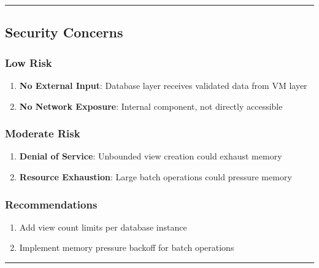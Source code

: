 \documentclass[
]{article}
\providecommand{\tightlist}{%
  \setlength{\itemsep}{0pt}\setlength{\parskip}{0pt}}
\begin{document}
\begin{center}\rule{0.5\linewidth}{0.5pt}\end{center}

\subsection{Security Concerns}\label{security-concerns}

\subsubsection{Low Risk}\label{low-risk}

\begin{enumerate}
\def\labelenumi{\arabic{enumi}.}
\tightlist
\item
  \textbf{No External Input}: Database layer receives validated data
  from VM layer
\item
  \textbf{No Network Exposure}: Internal component, not directly
  accessible
\end{enumerate}

\subsubsection{Moderate Risk}\label{moderate-risk}

\begin{enumerate}
\def\labelenumi{\arabic{enumi}.}
\tightlist
\item
  \textbf{Denial of Service}: Unbounded view creation could exhaust
  memory
\item
  \textbf{Resource Exhaustion}: Large batch operations could pressure
  memory
\end{enumerate}

\subsubsection{Recommendations}\label{recommendations-5}

\begin{enumerate}
\def\labelenumi{\arabic{enumi}.}
\tightlist
\item
  Add view count limits per database instance
\item
  Implement memory pressure backoff for batch operations
\end{enumerate}

\begin{center}\rule{0.5\linewidth}{0.5pt}\end{center}
\end{document}
